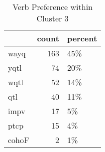 \begin{table}[htbp!]
\centering
\caption{Verb Preference within Cluster 3}
\label{table:clust3_verb_ct}
\begin{tabular}{lrl}
\toprule
{} &  count & percent \\
\midrule
wayq  &    163 &     45\% \\
yqtl  &     74 &     20\% \\
wqtl  &     52 &     14\% \\
qtl   &     40 &     11\% \\
impv  &     17 &      5\% \\
ptcp  &     15 &      4\% \\
cohoF &      2 &      1\% \\
\bottomrule
\end{tabular}
\end{table}
